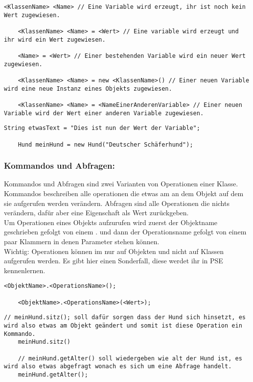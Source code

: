 \begin{lstlisting}[title=\textbf{Variablen Syntax}]
	<KlassenName> <Name> // Eine Variable wird erzeugt, ihr ist noch kein Wert zugewiesen.

	<KlassenName> <Name> = <Wert> // Eine variable wird erzeugt und ihr wird ein Wert zugewiesen.
	
	<Name> = <Wert> // Einer bestehenden Variable wird ein neuer Wert zugewiesen.
	
	<KlassenName> <Name> = new <KlassenName>() // Einer neuen Variable wird eine neue Instanz eines Objekts zugewiesen.
	
	<KlassenName> <Name> = <NameEinerAnderenVariable> // Einer neuen Variable wird der Wert einer anderen Variable zugewiesen. 
\end{lstlisting}
\begin{lstlisting}[title=\textbf{Variable Beispiel}]
 	String etwasText = "Dies ist nun der Wert der Variable";
 	
 	Hund meinHund = new Hund("Deutscher Schäferhund");
\end{lstlisting}

\subsubsection*{Kommandos und Abfragen:}
Kommandos und Abfragen sind zwei Varianten von Operationen einer Klasse. Kommandos beschreiben alle operationen die etwas am an dem Objekt auf dem sie aufgerufen werden verändern.
Abfragen sind alle Operationen die nichts verändern, dafür aber eine Eigenschaft als Wert zurückgeben.\\
Um Operationen eines Objekts aufzurufen wird zuerst der Objektname geschrieben gefolgt von einem . und dann der Operationsname gefolgt von einem paar Klammern in denen Parameter stehen können.\\
{\color{red} Wichtig: } Operationen können im nur auf Objekten und nicht auf Klassen aufgerufen werden.
Es  gibt hier einen Sonderfall, diese werdet ihr in PSE kennenlernen.

\begin{lstlisting}[title=\textbf{Kommando/Abfrage Syntax}]
	<ObjektName>.<OperationsName>();
	
	<ObjektName>.<OperationsName>(<Wert>);
\end{lstlisting}

\begin{lstlisting}[title=\textbf{Kommando/Abfrage Beispiel}]
    // meinHund.sitz(); soll dafür sorgen dass der Hund sich hinsetzt, es wird also etwas am Objekt geändert und somit ist diese Operation ein Kommando.
  	meinHund.sitz()

	// meinHund.getAlter() soll wiedergeben wie alt der Hund ist, es wird also etwas abgefragt wonach es sich um eine Abfrage handelt.
	meinHund.getAlter();
\end{lstlisting}
